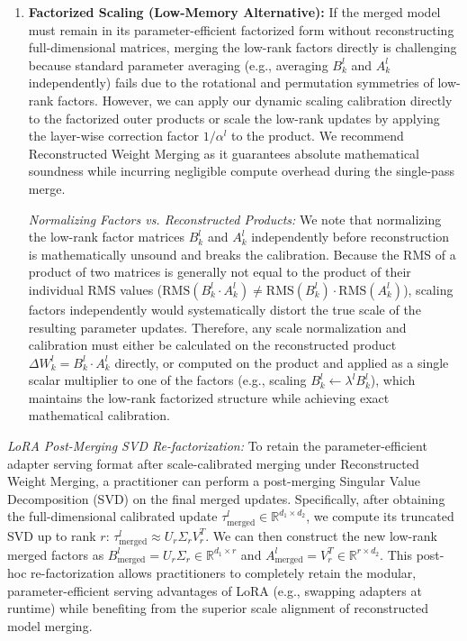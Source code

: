 \begin{enumerate}
    \item \textbf{Factorized Scaling (Low-Memory Alternative):} If the merged model must remain in its parameter-efficient factorized form without reconstructing full-dimensional matrices, merging the low-rank factors directly is challenging because standard parameter averaging (e.g., averaging $B_k^l$ and $A_k^l$ independently) fails due to the rotational and permutation symmetries of low-rank factors. However, we can apply our dynamic scaling calibration directly to the factorized outer products or scale the low-rank updates by applying the layer-wise correction factor $1/\alpha^l$ to the product. We recommend Reconstructed Weight Merging as it guarantees absolute mathematical soundness while incurring negligible compute overhead during the single-pass merge.
    
    \textit{Normalizing Factors vs. Reconstructed Products:} We note that normalizing the low-rank factor matrices $B_k^l$ and $A_k^l$ independently before reconstruction is mathematically unsound and breaks the calibration. Because the RMS of a product of two matrices is generally not equal to the product of their individual RMS values ($\text{RMS}(B_k^l \cdot A_k^l) \neq \text{RMS}(B_k^l) \cdot \text{RMS}(A_k^l)$), scaling factors independently would systematically distort the true scale of the resulting parameter updates. Therefore, any scale normalization and calibration must either be calculated on the reconstructed product $\Delta W_k^l = B_k^l \cdot A_k^l$ directly, or computed on the product and applied as a single scalar multiplier to one of the factors (e.g., scaling $B_k^l \leftarrow \lambda^l B_k^l$), which maintains the low-rank factorized structure while achieving exact mathematical calibration.
\end{enumerate}

\textit{LoRA Post-Merging SVD Re-factorization:} To retain the parameter-efficient adapter serving format after scale-calibrated merging under Reconstructed Weight Merging, a practitioner can perform a post-merging Singular Value Decomposition (SVD) on the final merged updates. Specifically, after obtaining the full-dimensional calibrated update $\tau_{\text{merged}}^l \in \mathbb{R}^{d_1 \times d_2}$, we compute its truncated SVD up to rank $r$: $\tau_{\text{merged}}^l \approx U_r \Sigma_r V_r^T$. We can then construct the new low-rank merged factors as $B_{\text{merged}}^l = U_r \Sigma_r \in \mathbb{R}^{d_1 \times r}$ and $A_{\text{merged}}^l = V_r^T \in \mathbb{R}^{r \times d_2}$. This post-hoc re-factorization allows practitioners to completely retain the modular, parameter-efficient serving advantages of LoRA (e.g., swapping adapters at runtime) while benefiting from the superior scale alignment of reconstructed model merging.

